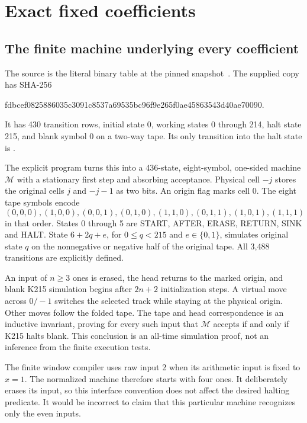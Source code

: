 \documentclass[11pt,a4paper]{article}
\theoremstyle{definition}\newtheorem{definition}[theorem]{Definition}
\newcommand{\file}[1]{\texttt{\detokenize{#1}}}
\begin{document}
\section{Exact fixed coefficients}\label{sec:constants}

\subsection{The finite machine underlying every coefficient}
The source is the literal binary table
at the pinned snapshot~\cite{k215}. The supplied copy has SHA-256
\begin{center}\small\ttfamily
fdbcef0825886035c3091c8537a69535bc96f9e265f0ae45863543d40ae70090.
\end{center}
It has 430 transition rows, initial state 0, working states 0 through 214,
halt state 215, and blank symbol 0 on a two-way tape. Its only transition
into the halt state is \file{68 1 1 R 215}.

The explicit program \file{normalized_k215.py} turns this into a
436-state, eight-symbol, one-sided machine $\mathcal M$ with a stationary
first step and absorbing acceptance. Physical cell $-j$ stores the
original cells $j$ and $-j-1$ as two bits. An origin flag marks cell 0.
The eight tape symbols encode
\[
 (0,0,0),(1,0,0),(0,0,1),(0,1,0),
 (1,1,0),(0,1,1),(1,0,1),(1,1,1)
\]
in that order. States 0 through 5 are START, AFTER, ERASE, RETURN, SINK
and HALT. State $6+2q+e$, for $0\le q<215$ and $e\in\{0,1\}$,
simulates original state $q$ on the nonnegative or negative half of
the original tape. All 3,488 transitions are explicitly defined.

An input of $n\ge3$ ones is erased, the head returns to the marked
origin, and blank K215 simulation begins after $2n+2$ initialization
steps. A virtual move across $0/-1$ switches the selected track while
staying at the physical origin. Other moves follow the folded tape.
The tape and head correspondence is an inductive invariant, proving
for every such input that $\mathcal M$ accepts if and only if K215
halts blank. This conclusion is an all-time simulation proof, not an
inference from the finite execution tests.

The finite window compiler uses raw input 2 when its arithmetic input
is fixed to $x=1$. The normalized machine therefore starts with four
ones. It deliberately erases its input, so this interface convention
does not affect the desired halting predicate. It would be incorrect
to claim that this particular machine recognizes only the even inputs.
\end{document}
